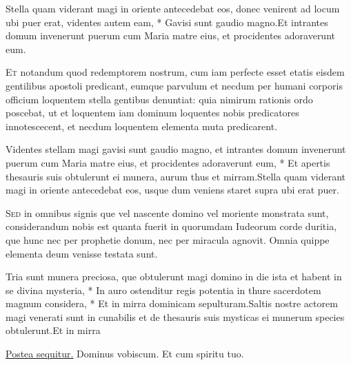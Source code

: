 \begin{multicols*}{2}
\begin{responsory}
{Stella quam viderant magi in oriente antecedebat eos, donec venirent ad locum ubi puer erat, videntes autem eam, * Gavisi sunt gaudio magno.}{Et intrantes domum invenerunt puerum cum Maria matre eius, et procidentes adoraverunt eum.}
\end{responsory}
\lettrine[lines=2]{\zallmancaps \color{Blue} E}{t} notandum quod redemptorem nostrum, cum iam perfecte esset etatis eisdem gentilibus apostoli predicant, eumque parvulum et necdum per humani corporis officium loquentem stella gentibus denuntiat: quia nimirum rationis ordo poscebat, ut et loquentem iam dominum loquentes nobis predicatores innotescecent, et necdum loquentem elementa muta predicarent.
\begin{responsory}
{Videntes stellam magi gavisi sunt gaudio magno, et intrantes domum invenerunt puerum cum Maria matre eius, et procidentes adoraverunt eum, * Et apertis thesauris suis obtulerunt ei munera, aurum thus et mirram.}{Stella quam viderant magi in oriente antecedebat eos, usque dum veniens staret supra ubi erat puer.}
\end{responsory}
\lettrine[lines=2]{\zallmancaps \color{Red} S}{ed} in omnibus signis que vel nascente domino vel moriente monstrata sunt, considerandum nobis est quanta fuerit in quorumdam Iudeorum corde duritia, que hunc nec per prophetie donum, nec per miracula agnovit. Omnia quippe elementa deum venisse testata sunt.
\begin{responsory-final}
{Tria sunt munera preciosa, que obtulerunt magi domino in die ista et habent in se divina mysteria, * In auro ostenditur regis potentia in thure sacerdotem magnum considera, * Et in mirra dominicam sepulturam.}{Saltis nostre actorem magi venerati sunt in cunabilis et de thesauris suis mysticas ei munerum species obtulerunt.}{Et in mirra}
\end{responsory-final}
\newline \ul{Postea sequitur.} Dominus vobiscum. Et cum spiritu tuo.

\end{multicols*}
